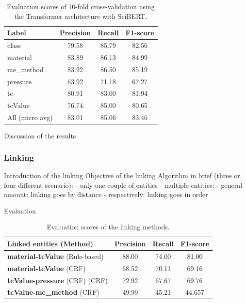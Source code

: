 \documentclass{article}
\begin{document}
\begin{table}[ht]
\centering
\begin{tabular}{lccc}
\hline \textbf{Label} & \textbf{Precision} & \textbf{Recall} & \textbf{F1-score} \\ \hline
class           & 79.58 & 85.79 & 82.56 \\
material        & 83.89 & 86.13 & 84.99 \\
me\_method      & 83.92 & 86.50 & 85.19 \\
pressure        & 63.92 & 71.18 & 67.27 \\
tc              & 80.91 & 83.00 & 81.94 \\
tcValue         & 76.74 & 85.00 & 80.65 \\
\hline
All (micro avg) & 83.01 & 85.06 & 83.46 \\
\hline
\end{tabular}
\caption{Evaluation scores of 10-fold cross-validation using the Transformer architecture with SciBERT. }
\end{table}

Discussion of the results 

\subsubsection{Linking}

Introduction of the linking
Objective of the linking
Algorithm in brief (three or four different scenario): 
 - only one couple of entities 
 - multiple entities:
  - general amount: linking goes by distance 
  - respectively: linking goes in order 

Evaluation

\begin{table}[ht]
\centering
\begin{tabular}{lccc}
\hline \textbf{Linked entities} (Method) & \textbf{Precision} & \textbf{Recall} & \textbf{F1-score} \\ \hline
\textbf{material-tcValue} (Rule-based)  & 88.00 	&   74.00      &	81.00      \\
\textbf{material-tcValue} (CRF)         & 68.52 &	70.11   &  69.16    \\
\textbf{tcValue-pressure} (CRF) (CRF)   & 72.92 &	67.67   &  69.76    \\
\textbf{tcValue-me\_method} (CRF)       & 49.99 &	45.21   &  44.657   \\
\hline
\end{tabular}
\caption{Evaluation scores of the linking methods. }
\end{table}
\end{document}
